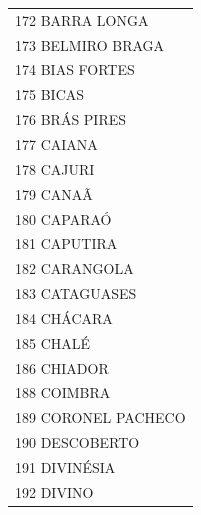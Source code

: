 \documentclass{article}
\begin{document}
\begin{longtable}[c]{m{18cm}}
\multicolumn{1}{l}{ \hspace{2em} 172 BARRA LONGA } \\
\multicolumn{1}{l}{ \hspace{2em} 173 BELMIRO BRAGA } \\
\multicolumn{1}{l}{ \hspace{2em} 174 BIAS FORTES } \\
\multicolumn{1}{l}{ \hspace{2em} 175 BICAS } \\
\multicolumn{1}{l}{ \hspace{2em} 176 BRÁS PIRES } \\
\multicolumn{1}{l}{ \hspace{2em} 177 CAIANA } \\
\multicolumn{1}{l}{ \hspace{2em} 178 CAJURI } \\
\multicolumn{1}{l}{ \hspace{2em} 179 CANAÃ } \\
\multicolumn{1}{l}{ \hspace{2em} 180 CAPARAÓ } \\
\multicolumn{1}{l}{ \hspace{2em} 181 CAPUTIRA } \\
\multicolumn{1}{l}{ \hspace{2em} 182 CARANGOLA } \\
\multicolumn{1}{l}{ \hspace{2em} 183 CATAGUASES } \\
\multicolumn{1}{l}{ \hspace{2em} 184 CHÁCARA } \\
\multicolumn{1}{l}{ \hspace{2em} 185 CHALÉ } \\
\multicolumn{1}{l}{ \hspace{2em} 186 CHIADOR } \\
\multicolumn{1}{l}{ \hspace{2em} 188 COIMBRA } \\
\multicolumn{1}{l}{ \hspace{2em} 189 CORONEL PACHECO } \\
\multicolumn{1}{l}{ \hspace{2em} 190 DESCOBERTO } \\
\multicolumn{1}{l}{ \hspace{2em} 191 DIVINÉSIA } \\
\multicolumn{1}{l}{ \hspace{2em} 192 DIVINO } \\

\end{longtable}
\end{document}
